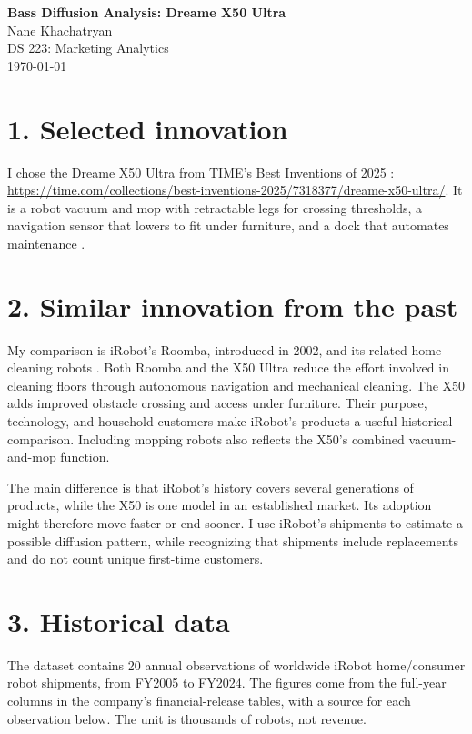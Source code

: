 \documentclass[11pt,a4paper]{article}
\begin{document}
\begin{center}
    \Large\textbf{Bass Diffusion Analysis: Dreame X50 Ultra} \\[0.3cm]
    \large Nane Khachatryan \\[0.1cm]
    \normalsize DS 223: Marketing Analytics \\[0.1cm]
    \normalsize \today
\end{center}

\section*{1. Selected innovation}
I chose the Dreame X50 Ultra from TIME's Best Inventions of 2025 \cite{S01}:
\url{https://time.com/collections/best-inventions-2025/7318377/dreame-x50-ultra/}.
It is a robot vacuum and mop with retractable legs for crossing thresholds, a navigation sensor that lowers to fit under furniture, and a dock that automates maintenance \cite{S02}.

\section*{2. Similar innovation from the past}
My comparison is iRobot's Roomba, introduced in 2002, and its related home-cleaning robots \cite{S12}. Both Roomba and the X50 Ultra reduce the effort involved in cleaning floors through autonomous navigation and mechanical cleaning. The X50 adds improved obstacle crossing and access under furniture. Their purpose, technology, and household customers make iRobot's products a useful historical comparison. Including mopping robots also reflects the X50's combined vacuum-and-mop function.

The main difference is that iRobot's history covers several generations of products, while the X50 is one model in an established market. Its adoption might therefore move faster or end sooner. I use iRobot's shipments to estimate a possible diffusion pattern, while recognizing that shipments include replacements and do not count unique first-time customers.

\section*{3. Historical data}
The dataset contains 20 annual observations of worldwide iRobot home/consumer robot shipments, from FY2005 to FY2024. The figures come from the full-year columns in the company's financial-release tables, with a source for each observation below. The unit is thousands of robots, not revenue.
\end{document}
